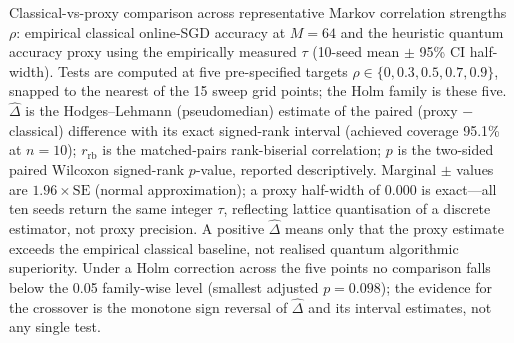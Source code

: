 \documentclass[sensors,article,submit,pdftex,moreauthors]{Definitions/mdpi}
\providecommand{\DIFadd}[1]{{\protect\color{blue}#1}} %
\providecommand{\DIFdel}[1]{} %
\providecommand{\DIFaddFL}[1]{\DIFadd{#1}} %
\providecommand{\DIFdelFL}[1]{\DIFdel{#1}} %
\providecommand{\DIFaddbeginFL}{} %
\providecommand{\DIFaddendFL}{} %
\providecommand{\DIFdelbeginFL}{} %
\providecommand{\DIFdelendFL}{} %
\begin{document}
\begin{table}[t]
\centering
\caption{Classical-vs-proxy comparison across representative Markov correlation strengths $\rho$: empirical classical online-SGD accuracy at $M = 64$ \DIFdelbeginFL \DIFdelFL{, }\DIFdelendFL \DIFaddbeginFL \DIFaddFL{and }\DIFaddendFL the heuristic quantum accuracy proxy using the empirically measured $\tau$ \DIFdelbeginFL \DIFdelFL{, }\DIFdelendFL \DIFaddbeginFL \DIFaddFL{(}\DIFaddendFL 10-seed \DIFdelbeginFL \DIFdelFL{half-width of the }\DIFdelendFL \DIFaddbeginFL \DIFaddFL{mean $\pm$ }\DIFaddendFL 95\% CI \DIFaddbeginFL \DIFaddFL{half-width). Tests are computed at five pre-specified targets $\rho \in \{0, 0.3, 0.5, 0.7, 0.9\}$}\DIFaddendFL , \DIFdelbeginFL \DIFdelFL{and }\DIFdelendFL \DIFaddbeginFL \DIFaddFL{snapped to }\DIFaddendFL the \DIFaddbeginFL \DIFaddFL{nearest of the 15 sweep grid points; the Holm family is these five. $\hat{\Delta}$ is the Hodges--Lehmann (pseudomedian) estimate of the }\DIFaddendFL paired \DIFaddbeginFL \DIFaddFL{(proxy $-$ classical) difference with its exact signed-rank interval (achieved coverage 95.1\% at $n = 10$); $r_{\mathrm{rb}}$ is the matched-pairs rank-biserial correlation; $p$ is the two-sided paired }\DIFaddendFL Wilcoxon signed-rank $p$-value\DIFaddbeginFL \DIFaddFL{, reported descriptively. Marginal $\pm$ values are $1.96 \times \mathrm{SE}$ }\DIFaddendFL (\DIFdelbeginFL \DIFdelFL{two-sided}\DIFdelendFL \DIFaddbeginFL \DIFaddFL{normal approximation}\DIFaddendFL )\DIFaddbeginFL \DIFaddFL{; a proxy half-width of $0.000$ is exact---all ten seeds return the same integer $\tau$, reflecting lattice quantisation of a discrete estimator, not proxy precision}\DIFaddendFL . \DIFdelbeginFL \DIFdelFL{``Proxy $>$ classical'' }\DIFdelendFL \DIFaddbeginFL \DIFaddFL{A positive $\hat{\Delta}$ }\DIFaddendFL means \DIFaddbeginFL \DIFaddFL{only that }\DIFaddendFL the proxy estimate exceeds the empirical classical baseline, not \DIFdelbeginFL \DIFdelFL{realized }\DIFdelendFL \DIFaddbeginFL \DIFaddFL{realised }\DIFaddendFL quantum algorithmic superiority. \DIFdelbeginFL \DIFdelFL{Significant differences are marked with $^{\star}$ }\DIFdelendFL \DIFaddbeginFL \DIFaddFL{Under a Holm correction across the five points no comparison falls below the 0.05 family-wise level }\DIFaddendFL (\DIFdelbeginFL \DIFdelFL{$p < 0.05$}\DIFdelendFL \DIFaddbeginFL \DIFaddFL{smallest adjusted $p = 0.098$}\DIFaddendFL )\DIFaddbeginFL \DIFaddFL{; the evidence for the crossover is the monotone sign reversal of $\hat{\Delta}$ and its interval estimates, not any single test}\DIFaddendFL .\DIFdelbeginFL \DIFdelFL{Accuracies are reported as mean $\pm$ half-width.}\DIFdelendFL }

\end{table}
\end{document}
